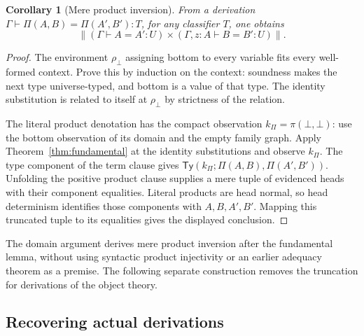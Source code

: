 \documentclass[11pt,a4paper]{article}
\newtheorem{corollary}[theorem]{Corollary}
\theoremstyle{definition}
\theoremstyle{remark}
\newcommand{\TyRel}{\mathsf{Ty}}
\newcommand{\trunc}[1]{\left\lVert #1\right\rVert}
\begin{document}
\begin{corollary}[Mere product inversion]\label{cor:independent-pi}
From a derivation $\Gamma\vdash\Pi(A,B)=\Pi(A',B'):T$, for any
classifier $T$, one obtains
\[
 \trunc{(\Gamma\vdash A=A':U)\mathbin{\times}
          (\Gamma,z:A\vdash B=B':U)}.
\]
\end{corollary}
\begin{proof}
The environment $\rho_\bot$ assigning bottom to every variable fits
every well-formed context. Prove this by induction on the context:
soundness makes the next type universe-typed, and bottom is a value of
that type. The identity substitution is related to itself at $\rho_\bot$
by strictness of the relation.

The literal product denotation has the compact observation
$k_\Pi=\pi(\bot,\bot)$: use the bottom observation of its domain and the
empty family graph. Apply Theorem~\ref{thm:fundamental} at the identity
substitutions and observe $k_\Pi$. The type component of the term clause
gives $\TyRel(k_\Pi;\Pi(A,B),\Pi(A',B'))$. Unfolding the positive
product clause supplies a mere tuple of evidenced heads with their
component equalities. Literal products are head normal, so head
determinism identifies those components with $A,B,A',B'$. Mapping this
truncated tuple to its equalities gives the displayed conclusion.
\end{proof}

The domain argument derives mere product inversion after the fundamental
lemma, without using syntactic product injectivity or an earlier adequacy
theorem as a premise. The following separate construction removes the
truncation for derivations of the object theory.

\subsection{Recovering actual derivations}
\end{document}
